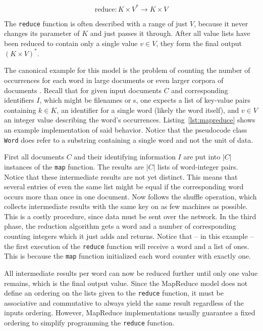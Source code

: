 \[\text{reduce}: K\times{}V^*\rightarrow{}K\times{}V\]

The \lstinline|reduce| function is often described with a range of just $V$, because it never changes its parameter of $K$ and just passes it through. After all value lists have been reduced to contain only a single value $v\in{}V$, they form the final output $(K\times{}V)^*$.

The canonical example for this model is the problem of counting the number of occurrences for each word in large documents or even larger corpora of documents \cite{dean2008mapreduce}. Recall that for given input documents $C$ and corresponding identifiers $I$, which might be filenames or \URL{}s, one expects a list of key-value pairs containing $k\in{}K$, an identifier for a single word (likely the word itself), and $v\in{}V$ an integer value describing the word's occurrences. Listing~\ref{lst:mapreduce} shows an example implementation of said behavior. Notice that the pseudocode class \lstinline|Word| does refer to a substring containing a single word and not the unit of data.

First all documents $C$ and their identifying information $I$ are put into $|C|$ instances of the \lstinline|map| function. The results are $|C|$ lists of word-integer pairs. Notice that these intermediate results are not yet distinct. This means that several entries of even the same list might be equal if the corresponding word occurs more than once in one document. Now follows the shuffle operation, which collects intermediate results with the same key on as few machines as possible. This is a costly procedure, since data must be sent over the network. In the third phase, the reduction algorithm gets a word and a number of corresponding counting integers which it just adds and returns. Notice that -- in this example -- the first execution of the \lstinline|reduce| function will receive a word and a list of ones. This is because the \lstinline|map| function initialized each word counter with exactly one.

All intermediate results per word can now be reduced further until only one value remains, which is the final output value. Since the MapReduce model does not define an ordering on the lists given to the \lstinline|reduce| function, it must be associative and commutative to always yield the same result regardless of the inputs ordering. However, MapReduce implementations usually guarantee a fixed ordering to simplify programming the \lstinline|reduce| function.


